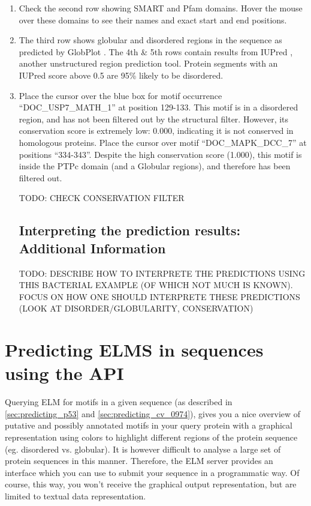 \documentclass[12pt]{article}
\begin{document}
\begin{enumerate}
\item Check the second row showing SMART and Pfam domains. Hover the mouse over
	these domains to see their names and exact start and end positions.

\item The third row shows globular and disordered regions in the sequence as
	predicted by GlobPlot \citep{12824398}. The 4th \& 5th rows contain
	results from IUPred \citep{15955779}, another unstructured region
	prediction tool. Protein segments with an IUPred score above 0.5 are
	95\% likely to be disordered.  

\item Place the cursor over the blue box for motif occurrence
	``DOC\_USP7\_MATH\_1'' at position 129-133. This motif is in a
	disordered region, and has not been filtered out by the structural
	filter. However, its conservation score is extremely low: 0.000,
	indicating it is not conserved in homologous proteins. Place the cursor
	over motif ``DOC\_MAPK\_DCC\_7'' at positions ``334-343''. Despite the
	high conservation score (1.000), this motif is inside the PTPc domain
	(and a Globular regions), and therefore has been filtered out.

TODO: CHECK CONSERVATION FILTER

%
%
\subsection*{Interpreting the prediction results: Additional Information}
\label{subsec:predicting_cv_0974_additional_information}

TODO: DESCRIBE HOW TO INTERPRETE THE PREDICTIONS USING THIS BACTERIAL
EXAMPLE (OF WHICH NOT MUCH IS KNOWN). FOCUS ON HOW ONE SHOULD INTERPRETE
THESE PREDICTIONS (LOOK AT DISORDER/GLOBULARITY, CONSERVATION)

\end{enumerate}

\clearpage

\section{Predicting ELMS in sequences using the API}
\label{sec:predicting_REST}

Querying ELM for motifs in a given sequence (as described in
\ref{sec:predicting_p53} and \ref{sec:predicting_cv_0974}), gives you a nice
overview of putative and possibly
annotated motifs in your query protein with a graphical representation
using colors to highlight different regions of the protein sequence (eg.
disordered vs. globular). It is however difficult to analyse a large set
of protein sequences in this manner. Therefore, the ELM server
provides an interface which you can use to submit your sequence in a
programmatic way. Of course, this way, you won't receive the graphical
output representation, but are limited to textual data representation.
\end{document}
